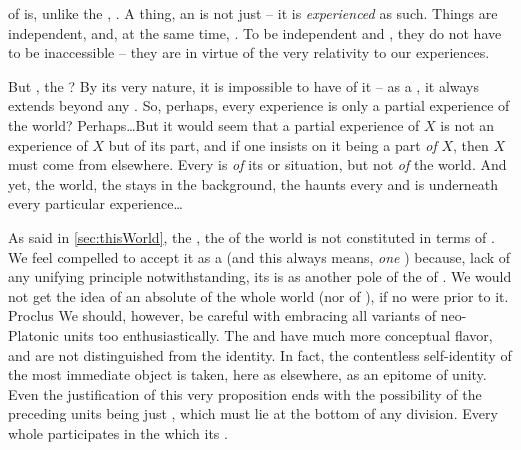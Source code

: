   

 of  is, unlike the ,
.  A thing, an  is not just  -- it is
{\em experienced} as such.  Things are independent,  and, at the
same time, .  To be independent and , they do not
have to be inaccessible -- they are  in virtue of the very
relativity to our experiences.

But , the ? By its very nature, it is
impossible to have  of it -- as a , it always
extends beyond any . So, perhaps, every experience is only
a partial experience of the world? Perhaps\ldots But it would seem that a
partial experience of $X$ is not an experience of $X$ but of its part, and if
one insists on it being a part {\em of} $X$, then $X$ must come from elsewhere.
Every  is  {\em of} its  or
situation, but not {\em of} the world. And yet, the world, the  stays in the background, the  haunts every
 and is  underneath every particular
experience\ldots



\label{pa:perspectives} As said in
\ref{sec:thisWorld}, the , the  of the world is not
constituted in terms of . We feel compelled to accept it as a
 (and this always means, {\em one} ) because, lack of
any unifying principle notwithstanding, its  is  as
another pole of the  of .  We would not get the idea of an
absolute  of the whole world (nor of ), if no
 were  prior to it.  \citet{Every whole composed of
  parts participates in a unity preceding these parts.}{Proclus}{
   We should, however, be careful with embracing all
  variants of neo-Platonic units too enthusiastically. The  and
   have much more conceptual flavor, and are not distinguished from
  the  identity. In fact, the contentless self-identity of the
  most immediate object is taken, here as elsewhere, as an epitome of unity.
  Even the justification of this very proposition ends with the possibility of
  the preceding units being just , which must lie at the bottom
  of any division.}  Every whole participates in the  which
 its .

